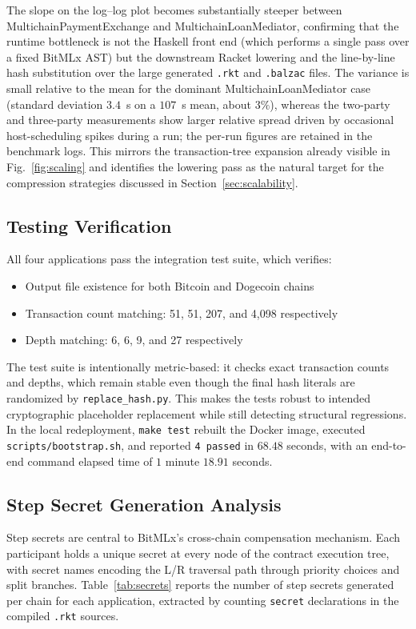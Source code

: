 \documentclass[journal]{IEEEtran}
\begin{document}
The slope on the log--log plot becomes substantially steeper between MultichainPaymentExchange and MultichainLoanMediator, confirming that the runtime bottleneck is not the Haskell front end (which performs a single pass over a fixed BitMLx AST) but the downstream Racket lowering and the line-by-line hash substitution over the large generated \texttt{.rkt} and \texttt{.balzac} files. The variance is small relative to the mean for the dominant MultichainLoanMediator case (standard deviation $3.4$~s on a $107$~s mean, about $3\%$), whereas the two-party and three-party measurements show larger relative spread driven by occasional host-scheduling spikes during a run; the per-run figures are retained in the benchmark logs. This mirrors the transaction-tree expansion already visible in Fig.~\ref{fig:scaling} and identifies the lowering pass as the natural target for the compression strategies discussed in Section~\ref{sec:scalability}.

\subsection{Testing Verification}

All four applications pass the integration test suite, which verifies:
\begin{itemize}
\item Output file existence for both Bitcoin and Dogecoin chains
\item Transaction count matching: 51, 51, 207, and 4,098 respectively
\item Depth matching: 6, 6, 9, and 27 respectively
\end{itemize}

The test suite is intentionally metric-based: it checks exact transaction counts and depths, which remain stable even though the final hash literals are randomized by \texttt{replace\_hash.py}. This makes the tests robust to intended cryptographic placeholder replacement while still detecting structural regressions. In the local redeployment, \texttt{make test} rebuilt the Docker image, executed \texttt{scripts/bootstrap.sh}, and reported \texttt{4 passed} in $68.48$ seconds, with an end-to-end command elapsed time of $1$ minute $18.91$ seconds.

\subsection{Step Secret Generation Analysis}

Step secrets are central to BitMLx's cross-chain compensation mechanism. Each participant holds a unique secret at every node of the contract execution tree, with secret names encoding the L/R traversal path through priority choices and split branches. Table~\ref{tab:secrets} reports the number of step secrets generated per chain for each application, extracted by counting \texttt{secret} declarations in the compiled \texttt{.rkt} sources.
\end{document}
